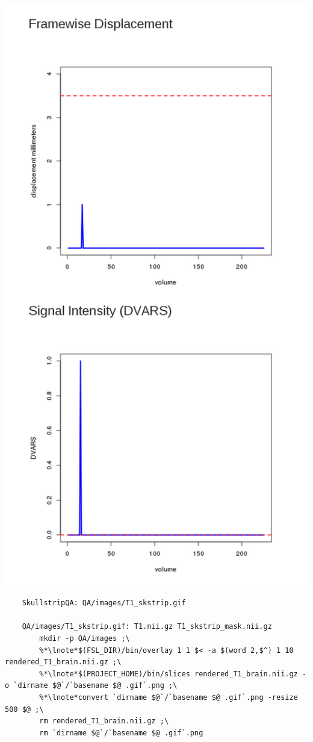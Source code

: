 \includegraphics[scale=0.3]{QAmotion2.png}

\begin{lstlisting}
	SkullstripQA: QA/images/T1_skstrip.gif

	QA/images/T1_skstrip.gif: T1.nii.gz T1_skstrip_mask.nii.gz
		mkdir -p QA/images ;\
		%*\lnote*$(FSL_DIR)/bin/overlay 1 1 $< -a $(word 2,$^) 1 10 rendered_T1_brain.nii.gz ;\
		%*\lnote*$(PROJECT_HOME)/bin/slices rendered_T1_brain.nii.gz -o `dirname $@`/`basename $@ .gif`.png ;\
		%*\lnote*convert `dirname $@`/`basename $@ .gif`.png -resize 500 $@ ;\
		rm rendered_T1_brain.nii.gz ;\
		rm `dirname $@`/`basename $@ .gif`.png

\end{lstlisting}



